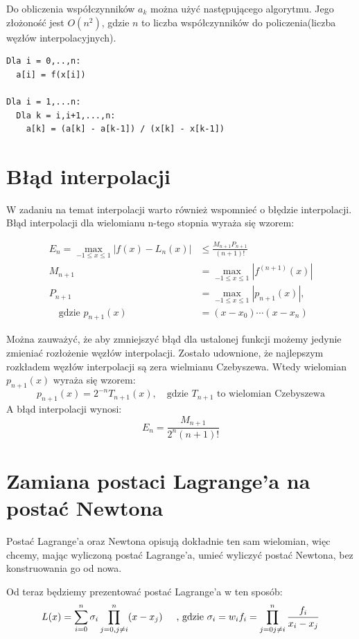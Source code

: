 \documentclass[a4paper]{article}
\begin{document}
Do obliczenia współczynników $a_k$ można użyć następującego algorytmu. Jego złożoność jest $O(n^2)$,
gdzie $n$ to liczba współczynników do policzenia(liczba węzłów interpolacyjnych).

\begin{verbatim}
Dla i = 0,..,n:
  a[i] = f(x[i])

Dla i = 1,...n:
  Dla k = i,i+1,...,n:
    a[k] = (a[k] - a[k-1]) / (x[k] - x[k-1])
\end{verbatim}

\section{Błąd interpolacji}
W zadaniu na temat interpolacji warto również wspomnieć o błędzie interpolacji. Błąd interpolacji
dla wielomianu n-tego stopnia wyraża się wzorem:

\begin{align*}
  E_n = \max_{-1\le x\le 1} |f(x) - L_n(x)| &\le \frac{M_{n+1}P_{n+1}}{(n+1)!}\\
  M_{n+1} &= \max_{-1 \le x \le 1} |f^{(n+1)}(x)| \\
P_{n+1} &= \max_{-1 \le x \le 1} |p_{n+1}(x)|, \\
\quad \text{gdzie } p_{n+1}(x) &= (x - x_0)\cdots(x-x_n)
\end{align*}

Można zauważyć, że aby zmniejszyć błąd dla ustalonej funkcji możemy jedynie zmieniać rozłożenie
węzłów interpolacji. Zostało udownione, że najlepszym rozkładem węzłów interpolacji są zera 
wielmianu Czebyszewa. Wtedy wielomian $p_{n+1}(x)$ wyraża się wzorem:
$$ p_{n+1}(x) = 2^{-n}T_{n+1}(x), \quad \text{gdzie $T_{n+1}$ to wielomian Czebyszewa} $$
A błąd interpolacji wynosi:
$$
E_n = \frac{M_{n+1}}{2^n(n+1)!}
$$



\section{Zamiana postaci Lagrange'a na postać Newtona}
Postać Lagrange'a oraz Newtona opisują dokładnie ten sam wielomian, więc 
chcemy, mając wyliczoną postać Lagrange'a, umieć wyliczyć postać Newtona, bez
konstruowania go od nowa.

Od teraz będziemy prezentować postać Lagrange'a w ten sposób:
$$ L(x) = \sum_{i=0}^{n} \sigma_i \prod_{j=0, j\neq i}^{n}(x - x_j) 
\text{\hspace{0.5cm}, gdzie } \sigma_i = w_if_i  = \prod_{j = 0 j\neq i}^n \frac{f_i}{x_i - x_j}$$
\end{document}
